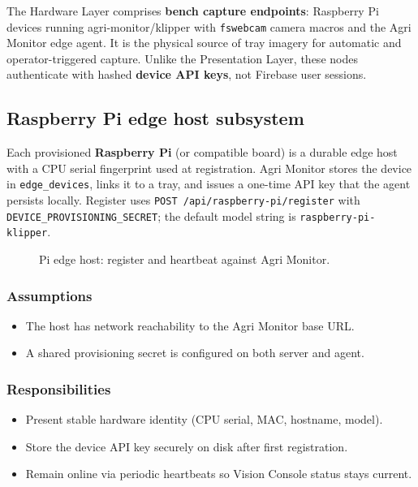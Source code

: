 The Hardware Layer comprises \textbf{bench capture endpoints}: Raspberry Pi devices running
agri-monitor/klipper with \texttt{fswebcam} camera macros and the Agri Monitor edge agent. It is the
physical source of tray imagery for automatic and operator-triggered capture. Unlike the
Presentation Layer, these nodes authenticate with hashed \textbf{device API keys}, not Firebase
user sessions.

\subsection{Raspberry Pi edge host subsystem}

Each provisioned \textbf{Raspberry Pi} (or compatible board) is a durable edge host with a CPU serial fingerprint used at registration. Agri Monitor stores the device in \texttt{edge\_devices}, links it to a tray, and issues a one-time API key that the agent persists locally. Register uses \texttt{POST /api/raspberry-pi/register} with \texttt{DEVICE\_PROVISIONING\_SECRET}; the default model string is \texttt{raspberry-pi-klipper}.

\begin{figure}[H]
\centering
{}
\caption{Pi edge host: register and heartbeat against Agri Monitor.}
\label{fig:hw-pi}
\end{figure}

\subsubsection{Assumptions}
\begin{itemize}
  \item The host has network reachability to the Agri Monitor base URL.
  \item A shared provisioning secret is configured on both server and agent.
\end{itemize}

\subsubsection{Responsibilities}
\begin{itemize}
  \item Present stable hardware identity (CPU serial, MAC, hostname, model).
  \item Store the device API key securely on disk after first registration.
  \item Remain online via periodic heartbeats so Vision Console status stays current.
\end{itemize}


